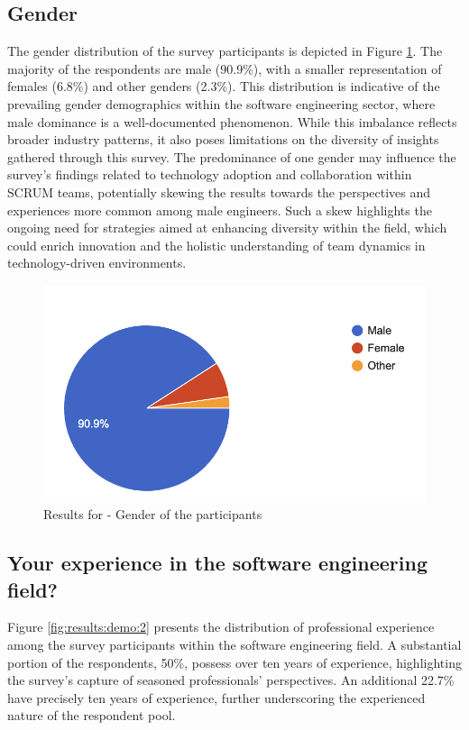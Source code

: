 \subsection*{Gender}
The gender distribution of the survey participants is depicted in Figure \ref{fig:results:demo:1}. The majority of the respondents are male (90.9\%), with a smaller representation of females (6.8\%) and other genders (2.3\%). This distribution is indicative of the prevailing gender demographics within the software engineering sector, where male dominance is a well-documented phenomenon. While this imbalance reflects broader industry patterns, it also poses limitations on the diversity of insights gathered through this survey. The predominance of one gender may influence the survey's findings related to technology adoption and collaboration within \ac{SCRUM} teams, potentially skewing the results towards the perspectives and experiences more common among male engineers. Such a skew highlights the ongoing need for strategies aimed at enhancing diversity within the field, which could enrich innovation and the holistic understanding of team dynamics in technology-driven environments.


\begin{figure}[h!]
\centering
\includegraphics[width=\linewidth]{Images/Survey/demo_1.png}
\caption{Results for - Gender of the participants}
\label{fig:results:demo:1}
\end{figure}

\pagebreak

\subsection*{Your experience in the software engineering field?}

Figure \ref{fig:results:demo:2} presents the distribution of professional experience among the survey participants within the software engineering field. A substantial portion of the respondents, 50\%, possess over ten years of experience, highlighting the survey's capture of seasoned professionals' perspectives. An additional 22.7\% have precisely ten years of experience, further underscoring the experienced nature of the respondent pool. 

